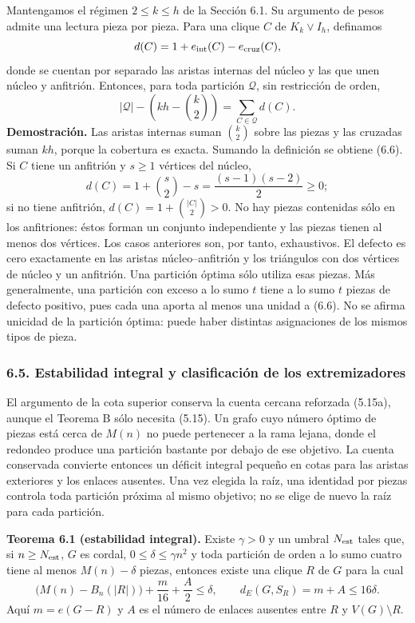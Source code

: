 \documentclass[spanish,11pt,a4paper]{article}
\begin{document}
Mantengamos el régimen \(2\le k\le h\) de la Sección 6.1. Su argumento de pesos admite una lectura pieza por pieza. Para una clique \(C\) de \(K_k\vee I_h\), definamos \[
d(C)=1+e_{\rm int}(C)-e_{\rm cruz}(C),
\] donde se cuentan por separado las aristas internas del núcleo y las que unen núcleo y anfitrión. Entonces, para toda partición \(\mathcal Q\), sin restricción de orden, \[
|\mathcal Q|-\left(kh-\binom k2\right)
=\sum_{C\in\mathcal Q}d(C).
\tag{6.6}
\] \textbf{Demostración.} Las aristas internas suman \(\binom k2\) sobre las piezas y las cruzadas suman \(kh\), porque la cobertura es exacta. Sumando la definición se obtiene (6.6). Si \(C\) tiene un anfitrión y \(s\ge1\) vértices del núcleo, \[
d(C)=1+\binom s2-s=\frac{(s-1)(s-2)}2\ge0;
\] si no tiene anfitrión, \(d(C)=1+\binom{|C|}2>0\). No hay piezas contenidas sólo en los anfitriones: éstos forman un conjunto independiente y las piezas tienen al menos dos vértices. Los casos anteriores son, por tanto, exhaustivos. El defecto es cero exactamente en las aristas núcleo--anfitrión y los triángulos con dos vértices de núcleo y un anfitrión. Una partición óptima sólo utiliza esas piezas. Más generalmente, una partición con exceso a lo sumo \(t\) tiene a lo sumo \(t\) piezas de defecto positivo, pues cada una aporta al menos una unidad a (6.6). No se afirma unicidad de la partición óptima: puede haber distintas asignaciones de los mismos tipos de pieza.

\subsubsection{6.5. Estabilidad integral y clasificación de los extremizadores}\label{estabilidad-integral-y-clasificacion-de-los-extremizadores}

El argumento de la cota superior conserva la cuenta cercana reforzada (5.15a), aunque el Teorema B sólo necesita (5.15). Un grafo cuyo número óptimo de piezas está cerca de \(M(n)\) no puede pertenecer a la rama lejana, donde el redondeo produce una partición bastante por debajo de ese objetivo. La cuenta conservada convierte entonces un déficit integral pequeño en cotas para las aristas exteriores y los enlaces ausentes. Una vez elegida la raíz, una identidad por piezas controla toda partición próxima al mismo objetivo; no se elige de nuevo la raíz para cada partición.


\textbf{Teorema 6.1 (estabilidad integral).} Existe \(\gamma>0\) y un umbral \(N_{\rm est}\) tales que, si \(n\ge N_{\rm est}\), \(G\) es cordal, \(0\le\delta\le\gamma n^2\) y toda partición de orden a lo sumo cuatro tiene al menos \(M(n)-\delta\) piezas, entonces existe una clique \(R\) de \(G\) para la cual \[
\bigl(M(n)-B_n(|R|)\bigr)+\frac m{16}+\frac A2\le\delta,
\qquad
d_E(G,S_R)=m+A\le16\delta.
\tag{6.7}
\] Aquí \(m=e(G-R)\) y \(A\) es el número de enlaces ausentes entre \(R\) y \(V(G)\setminus R\).
\end{document}
